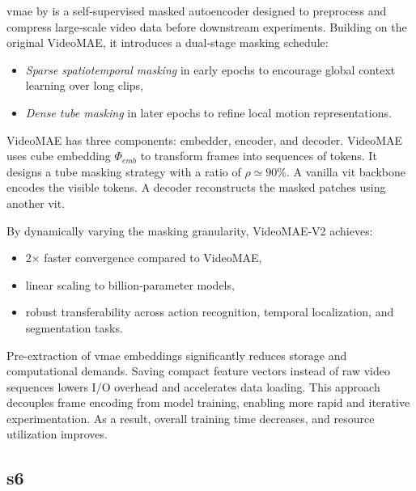 \acrfull{vmae} by \textcite{wang_videomae_2023} is a self‑supervised masked autoencoder designed to preprocess and compress large‑scale video data before downstream experiments. Building on the original VideoMAE\cite{tong_videomae_2022}, it introduces a dual‑stage masking schedule: 

\begin{itemize}
    \item \emph{Sparse spatiotemporal masking} in early epochs to encourage global context learning over long clips,
    \item \emph{Dense tube masking} in later epochs to refine local motion representations.
\end{itemize}

VideoMAE has three components: embedder, encoder, and decoder. VideoMAE uses cube embedding \(\Phi_{emb}\) to transform frames into sequences of tokens. It designs a tube masking strategy with a ratio of \(\rho \simeq 90\%\). A vanilla \acrshort{vit} backbone encodes the visible tokens. A decoder reconstructs the masked patches using another \acrshort{vit}\cite{wang_videomae_2023}. 

By dynamically varying the masking granularity, VideoMAE‑V2 achieves:
\begin{itemize}
    \item 2× faster convergence compared to VideoMAE,
    \item linear scaling to billion‑parameter models,
    \item robust transferability across action recognition, temporal localization, and segmentation tasks\cite{wang_videomae_2023}.
\end{itemize}

Pre-extraction of \acrshort{vmae} embeddings significantly reduces storage and computational demands. Saving compact feature vectors instead of raw video sequences lowers I/O overhead and accelerates data loading. This approach decouples frame encoding from model training, enabling more rapid and iterative experimentation. As a result, overall training time decreases, and resource utilization improves.

\subsection{\acrfull{s6}}
\label{ssec:s6}

